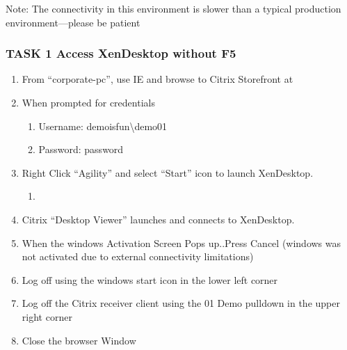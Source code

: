 \documentclass[letterpaper,10pt,english]{sphinxmanual}
\begin{document}
Note: The connectivity in this environment is slower than a typical
production environment—please be patient


\subsubsection{TASK 1 \textendash{} Access XenDesktop without F5}
\label{\detokenize{class2/module2/lab1:task-1-access-xendesktop-without-f5}}
\begin{enumerate}
\item {} 
From “corporate-pc”, use IE and browse to Citrix Storefront at

\item {} 
When prompted for credentials
\begin{enumerate}
\item {} 
Username: demoisfun\textbackslash{}demo01

\item {} 
Password: password

\end{enumerate}

\item {} 
Right Click “Agility” and select “Start” icon to launch XenDesktop.
\begin{enumerate}
\item {} 

\end{enumerate}

\item {} 
Citrix “Desktop Viewer” launches and connects to XenDesktop.

\item {} 
When the windows Activation Screen Pops up..Press Cancel (windows was
not activated due to external connectivity limitations)

\item {} 
Log off using the windows start icon in the lower left corner

\item {} 
Log off the Citrix receiver client using the 01 Demo pulldown in the
upper right corner

\item {} 
Close the browser Window

\end{enumerate}
\end{document}
